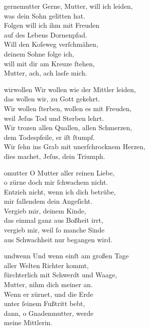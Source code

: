 \documentclass[tocstyle=ref-genre]{ees}
\begin{document}
{\begin{movement}{gernemutter}\enlargethispage\baselineskip
  \voice[Tenore]
  Gerne, Mutter, will ich leiden,\\
  was dein Sohn gelitten hat.\\
  Folgen will ich ihm mit Freuden\\
  auf des Lebens Dornenpfad.\\
  Will den Koſeweg verſchmähen,\\
  deinem Sohne folge ich,\\
  will mit dir am Kreuze ſtehen,\\
  Mutter, ach, ach lasſe mich.
\end{movement}

\begin{movement}{wirwollen}
  \voice[Coro]
  Wir wollen wie der Mittler leiden,\\
  das wollen wir, zu Gott gekehrt.\\
  Wir wollen ſterben, wollen es mit Freuden,\\
  weil Jeſus Tod und Sterben lehrt.\\
  Wir trozen allen Quallen, allen Schmerzen,\\
  dem Todespfeile, er iſt ſtumpf.\\
  Wir ſehn ins Grab mit unerſchrocknem Herzen,\\
  dies machet, Jeſus, dein Triumph.
\end{movement}

\begin{movement}{omutter}
  \voice[Alto]
  O Mutter aller reinen Liebe,\\
  o zürne doch mir ſchwachem nicht.\\
  Entzieh nicht, wenn ich dich betrübe,\\
  mir fallendem dein Angeſicht.\\
  Vergieb mir, deinem Kinde,\\
  das einmal ganz aus Boßheit irrt,\\
  vergieb mir, weil ſo manche Sinde\\
  aus Schwachheit nur begangen wird.
\end{movement}

\begin{movement}{undwenn}
  \voice[Basso]
  Und wenn einſt am großen Tage\\
  aller Welten Richter kommt,\\
  fürchterlich mit Schwerdt und Waage,\\
  Mutter, nihm dich meiner an.\\
  Wenn er zürnet, und die Erde\\
  unter ſeinem Fußtritt bebt,\\
  dann, o Gnadenmutter, werde\\
  meine Mittlerin.
\end{movement}

}
\end{document}
